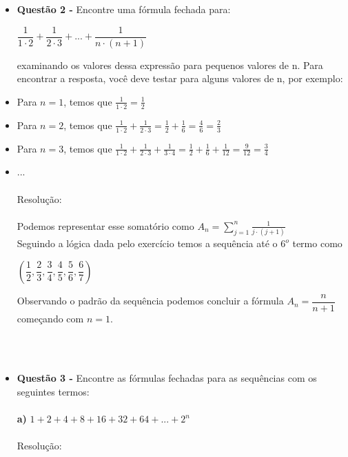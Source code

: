 \documentclass[a4paper,12pt]{article}
\begin{document}
\begin{itemize}
     \\\\ 
     \item [] \textbf{Questão 2 -} Encontre uma fórmula fechada para:
     \\
     
     \begin{centering}
     
     $\dfrac{1}{1\cdot 2} + \dfrac{1}{2\cdot 3} + ... + \dfrac{1}{n\cdot (n + 1)}$
     
     \end{centering}
     
     examinando os valores dessa expressão para pequenos valores de n.
     \newline
    Para encontrar a resposta, você deve testar para alguns valores de n, por exemplo:
    
    \item Para $n = 1$, temos que $\frac{1}{1\cdot 2} = \frac{1}{2}$
    \item Para $n = 2$, temos que $\frac{1}{1\cdot 2} + \frac{1}{2\cdot 3} = \frac{1}{2} + \frac{1}{6} = \frac{4}{6} = \frac{2}{3}$
    \item Para $n = 3$, temos que $\frac{1}{1\cdot 2} + \frac{1}{2\cdot 3} + \frac{1}{3\cdot 4} = \frac{1}{2} + \frac{1}{6} + \frac{1}{12} = \frac{9}{12} = \frac{3}{4}$
    \item ...
    \\\\Resolução:
    \\\\Podemos representar esse somatório como $A_n=\sum\limits_{j=1}^n \frac{1}{j\cdot (j+1)}$
    \\Seguindo a lógica dada pelo exercício temos a sequência até o $6^o$ termo como
    \begin{center}
    $\left(\dfrac{1}{2},\dfrac{2}{3},\dfrac{3}{4},\dfrac{4}{5},\dfrac{5}{6},\dfrac{6}{7}\right)$
    \end{center}
    Observando o padrão da sequência podemos concluir a fórmula $A_n=\dfrac{n}{n+1}$
    \\começando com $n=1$.
    
    
    \\\\
    \item[] \textbf{Questão 3 -} Encontre as fórmulas fechadas para as sequências com os seguintes termos:
    \\\\
    \textbf{a)} $1 + 2 + 4 + 8 + 16 + 32 + 64 + ... + 2^n$
    \\\\Resolução:
    

\end{itemize}
\end{document}
